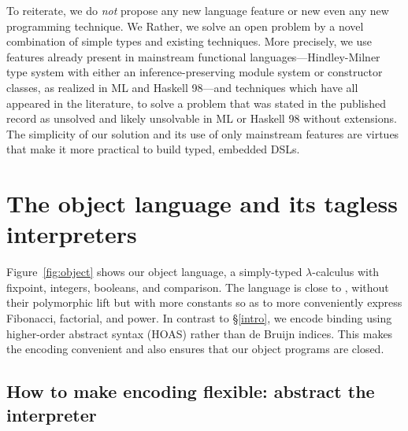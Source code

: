To reiterate, we do \emph{not} propose any new language
feature or \ifshort new \else even any new programming \fi technique.
\ifshort
We
\else
Rather, we solve an open problem by a novel combination of simple types
and existing techniques.  More precisely, we
\fi
use features already present in
mainstream functional languages---Hindley-Milner
type system with either an inference\hyp preserving module system or
constructor classes, as realized in ML and Haskell 98---and techniques
which have all appeared in the literature, to
solve a problem that was stated in the published record as
unsolved and likely unsolvable in ML or Haskell 98
without extensions. The simplicity of our solution and its
use of only mainstream features \ifshort\else are virtues that \fi make it more practical to build typed,
embedded DSLs.
\begin{comment}
We may claim some contribution about type-preserving CPS. Check
related work section in \citep{Guillemette-Monier-PLPV}, especially
check the work of Shao on type-preserving CPS in Flint. The PLPV paper
in related work shows other tasks, including closure conversion, which
we may tackle in our approach. We may be able to write a
type-preserving, assured compiler, whose properties and assured by HM.
\end{comment}


\section{The object language and its tagless interpreters}\label{language}

Figure~\ref{fig:object} shows our object language, a simply-typed
$\lambda$-calculus with fixpoint, integers, booleans, and comparison.
The language is close to , without their polymorphic
lift but with more constants so as to more conveniently express Fibonacci,
factorial, and power.
In contrast to \S\ref{intro}, we encode binding using higher-order
abstract syntax (HOAS) \citep{miller-manipulating,pfenning-higher-order}
rather than de Bruijn indices. This makes the encoding convenient and
also ensures that our object programs are closed.

\subsection{How to make encoding flexible: abstract the interpreter}
\label{encoding}

